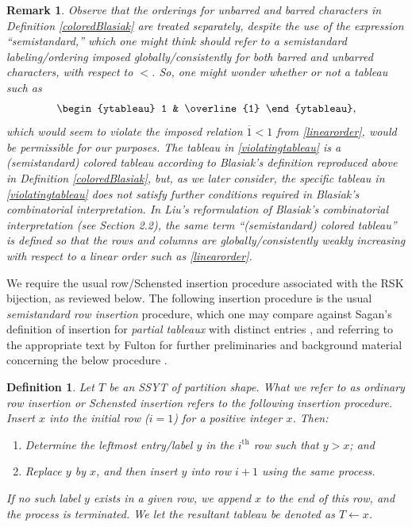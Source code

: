 \documentclass[12pt]{article}
\newtheorem{remark}{Remark}
\newtheorem{definition}{Definition}
\begin{document}
\begin{remark}\label{notcountercolored}
 Observe that the orderings for unbarred and barred characters in Definition \ref{coloredBlasiak} are treated \emph{separately}, despite 
 the use of the expression ``semistandard,'' which one might think should refer to a semistandard labeling/ordering imposed 
 globally/consistently for \emph{both} barred and unbarred characters, with respect to $<$. So, one might wonder whether or not 
 a tableau such as 
\begin{equation}\label{violatingtableau}
 \begin{ytableau} 1 & \overline{1} \end{ytableau}, 
\end{equation}
 which would seem to violate the imposed relation $\overline{1} < 1$ from \eqref{linearorder}, would be permissible for our purposes. 
 The tableau in \eqref{violatingtableau} \emph{is} a (semistandard) colored tableau according to Blasiak's definition reproduced above 
 in Definition \ref{coloredBlasiak}, but, as we later consider, the specific tableau in \eqref{violatingtableau} does not satisfy further 
 conditions required in Blasiak's combinatorial interpretation. In Liu's reformulation \cite{Liu2017} of Blasiak's combinatorial 
 interpretation (see Section 2.2), the same term ``(semistandard) colored tableau'' \emph{is} defined so that the rows and columns 
 \emph{are} globally/consistently weakly increasing with respect to a linear order such as \eqref{linearorder}. 
\end{remark}

 We require the usual row/Schensted insertion procedure associated with the RSK bijection, as reviewed below. The following 
 insertion procedure is the usual \emph{semistandard row insertion} procedure, which one may compare against Sagan's definition
 of insertion for \emph{partial tableaux} with distinct entries \cite[pp.\ 92--93]{Sagan2001}, and referring to the appropriate text by 
 Fulton for further preliminaries and background material concerning the below procedure \cite{Fulton1997}. 

\begin{definition}\label{defineSchensted}
 Let $T$ be an SSYT of partition shape. What we refer to as \emph{ordinary row insertion} or \emph{Schensted insertion} refers to the 
 following insertion procedure. Insert $x$ into the initial row ($i=1$) for a positive integer $x$. Then: 

\begin{enumerate}

\item Determine the leftmost entry/label $y$ in the $i^{\text{th}}$ row such that $y > x$; and 

\item Replace $y$ by $x$, and then insert $y$ into row $i+1$ using the same process. 

\end{enumerate}

\noindent If no such label $y$ exists in a given row, we append $x$ to the end of this row, and the process is terminated. We let the 
 resultant tableau be denoted as $ T\leftarrow x$. 
\end{definition}
\end{document}
